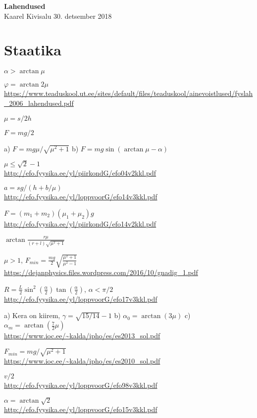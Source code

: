 \documentclass[a4paper,11pt,twocolumn]{article}
\begin{document}
{\huge \textbf{Lahendused}} \\
{Kaarel Kivisalu \hfill 30. detsember 2018}

\section{Staatika}
\begin{solutions}
	\item \( \alpha>\arctan \mu \)
	\item \( \varphi=\arctan 2\mu \) \\ \url{https://www.teaduskool.ut.ee/sites/default/files/teaduskool/ainevoistlused/fyslah_2006_lahendused.pdf}
	\item \( \mu=s/2h \)
	\item \( F=mg/2 \)
	\item a) \( F=mg\mu/\sqrt{\mu^2+1} \) b) \( F=mg \sin (\arctan \mu -\alpha) \)
	\item \( \mu \le \sqrt{2}-1 \) \\ \url{http://efo.fyysika.ee/yl/piirkondG/efo04v2kkl.pdf}
	\item 
	\item \( a=sg/(h+b/\mu) \) \\ \url{http://efo.fyysika.ee/yl/loppvoorG/efo14v3kkl.pdf}
	\item \( F=(m_1+m_2)(\mu_1+\mu_2)g \) \\ \url{http://efo.fyysika.ee/yl/piirkondG/efo14v2kkl.pdf}
	\item \( \arctan \frac{r\mu}{(r+l)\sqrt{\mu^2+1}} \)
	\item \( \mu > 1 \), \( F_{min}=\frac{mg}{2} \sqrt{\frac{\mu^2+1}{\mu^2-1}} \) \\
	\url{https://dejanphysics.files.wordpress.com/2016/10/gnadig_1.pdf}
	\item \( R=\frac{L}{2}\sin^2(\frac{\alpha}{2})\tan(\frac{\alpha}{2}) \), \( \alpha < \pi/2 \)\\ \url{http://efo.fyysika.ee/yl/loppvoorG/efo17v3kkl.pdf}
	\item a) Kera on kiirem, \( \gamma=\sqrt{15/14}-1 \) b) \( \alpha_0=\arctan(3\mu) \) c) \( \alpha_m=\arctan(\frac{7}{2}\mu) \)  \\ \url{https://www.ioc.ee/~kalda/ipho/es/es2013_sol.pdf}
	\item \( F_{min}={mg}/{\sqrt{\mu^2+1}} \) \\ \url{https://www.ioc.ee/~kalda/ipho/es/es2010_sol.pdf}
	\item \( v/2 \) \\ \url{http://efo.fyysika.ee/yl/loppvoorG/efo98v3kkl.pdf}
	\item \( \alpha=\arctan\sqrt{2} \)\\ \url{http://efo.fyysika.ee/yl/loppvoorG/efo15v3kkl.pdf}
\end{solutions}
\end{document}
